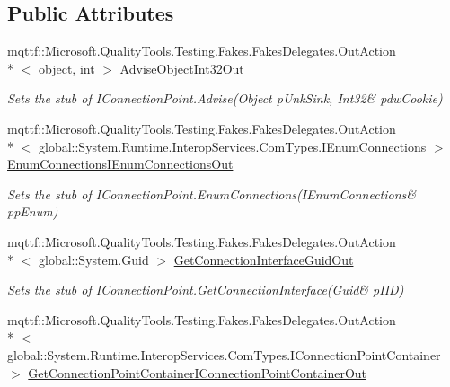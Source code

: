 \subsection*{Public Attributes}
\begin{DoxyCompactItemize}
\item 
mqttf\-::\-Microsoft.\-Quality\-Tools.\-Testing.\-Fakes.\-Fakes\-Delegates.\-Out\-Action\\*
$<$ object, int $>$ \hyperlink{class_system_1_1_runtime_1_1_interop_services_1_1_com_types_1_1_fakes_1_1_stub_i_connection_point_af830b261b7ebead1feaf45e91e9d4625}{Advise\-Object\-Int32\-Out}
\begin{DoxyCompactList}\small\item\em Sets the stub of I\-Connection\-Point.\-Advise(Object p\-Unk\-Sink, Int32\& pdw\-Cookie)\end{DoxyCompactList}\item 
mqttf\-::\-Microsoft.\-Quality\-Tools.\-Testing.\-Fakes.\-Fakes\-Delegates.\-Out\-Action\\*
$<$ global\-::\-System.\-Runtime.\-Interop\-Services.\-Com\-Types.\-I\-Enum\-Connections $>$ \hyperlink{class_system_1_1_runtime_1_1_interop_services_1_1_com_types_1_1_fakes_1_1_stub_i_connection_point_ac5994a833920ffbb058f3c53f709d897}{Enum\-Connections\-I\-Enum\-Connections\-Out}
\begin{DoxyCompactList}\small\item\em Sets the stub of I\-Connection\-Point.\-Enum\-Connections(I\-Enum\-Connections\& pp\-Enum)\end{DoxyCompactList}\item 
mqttf\-::\-Microsoft.\-Quality\-Tools.\-Testing.\-Fakes.\-Fakes\-Delegates.\-Out\-Action\\*
$<$ global\-::\-System.\-Guid $>$ \hyperlink{class_system_1_1_runtime_1_1_interop_services_1_1_com_types_1_1_fakes_1_1_stub_i_connection_point_a655f857c96cfe6609347e3cb3d14d7de}{Get\-Connection\-Interface\-Guid\-Out}
\begin{DoxyCompactList}\small\item\em Sets the stub of I\-Connection\-Point.\-Get\-Connection\-Interface(Guid\& p\-I\-I\-D)\end{DoxyCompactList}\item 
mqttf\-::\-Microsoft.\-Quality\-Tools.\-Testing.\-Fakes.\-Fakes\-Delegates.\-Out\-Action\\*
$<$ global\-::\-System.\-Runtime.\-Interop\-Services.\-Com\-Types.\-I\-Connection\-Point\-Container $>$ \hyperlink{class_system_1_1_runtime_1_1_interop_services_1_1_com_types_1_1_fakes_1_1_stub_i_connection_point_a4e641b2086c9674b8b223a9c1f1e8611}{Get\-Connection\-Point\-Container\-I\-Connection\-Point\-Container\-Out}

\end{DoxyCompactItemize}
